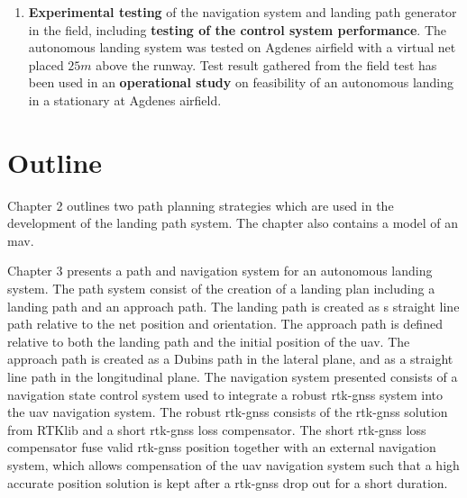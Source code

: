 \begin{enumerate}
\item \textbf{Experimental testing} of the navigation system and landing path generator in the field, including \textbf{testing of the control system performance}. The autonomous landing system was tested on Agdenes airfield with a virtual net placed $25 m$ above the runway. Test result gathered from the field test has been used in an \textbf{operational study} on feasibility of an autonomous landing in a stationary at Agdenes airfield.
\end{enumerate}
\section{Outline}
Chapter 2 outlines two path planning strategies which are used in the development of the landing path system. The chapter also contains a model of an \gls{mav}.

Chapter 3 presents a path and navigation system for an autonomous landing system. The path system consist of the creation of a landing plan including a landing path and an approach path. The landing path is created as s straight line path relative to the net position and orientation. The approach path is defined relative to both the landing path and the initial position of the \gls{uav}. The approach path is created as a Dubins path in the lateral plane, and as a straight line path in the longitudinal plane. The navigation system presented consists of a navigation state control system used to integrate a robust \gls{rtk-gnss} system into the \gls{uav} navigation system. The robust \gls{rtk-gnss} consists of the \gls{rtk-gnss} solution from RTKlib and a short \gls{rtk-gnss} loss compensator. The short \gls{rtk-gnss} loss compensator fuse valid \gls{rtk-gnss} position together with an external navigation system, which allows compensation of the \gls{uav} navigation system such that a high accurate position solution is kept after a \gls{rtk-gnss} drop out for a short duration.


